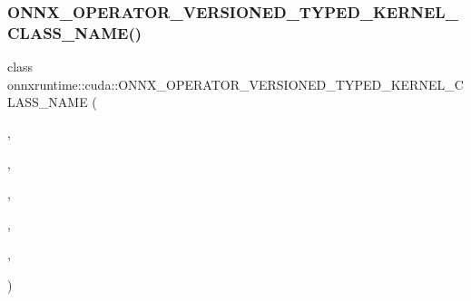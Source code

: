 \subsubsection{\texorpdfstring{O\+N\+N\+X\+\_\+\+O\+P\+E\+R\+A\+T\+O\+R\+\_\+\+V\+E\+R\+S\+I\+O\+N\+E\+D\+\_\+\+T\+Y\+P\+E\+D\+\_\+\+K\+E\+R\+N\+E\+L\+\_\+\+C\+L\+A\+S\+S\+\_\+\+N\+A\+M\+E()}{ONNX\_OPERATOR\_VERSIONED\_TYPED\_KERNEL\_CLASS\_NAME()}\hspace{0.1cm}{\footnotesize\ttfamily [10/10]}}
{\footnotesize\ttfamily class onnxruntime\+::cuda\+::\+O\+N\+N\+X\+\_\+\+O\+P\+E\+R\+A\+T\+O\+R\+\_\+\+V\+E\+R\+S\+I\+O\+N\+E\+D\+\_\+\+T\+Y\+P\+E\+D\+\_\+\+K\+E\+R\+N\+E\+L\+\_\+\+C\+L\+A\+S\+S\+\_\+\+N\+A\+ME (\begin{DoxyParamCaption}\item[{\mbox{\hyperlink{namespaceonnxruntime_a73ebc64887ddd1968e3cef47ffefe35b}{k\+Cuda\+Execution\+Provider}}}]{,  }\item[{\mbox{\hyperlink{namespaceonnxruntime_ac0e7c0c106a2c9e9594560a3ab289fa0}{k\+Onnx\+Domain}}}]{,  }\item[{6}]{,  }\item[{7}]{,  }\item[{uint32\+\_\+t}]{,  }\item[{\mbox{\hyperlink{classonnxruntime_1_1cuda_1_1Sum}{Sum}}}]{ }\end{DoxyParamCaption})}

\mbox{\label{namespaceonnxruntime_1_1cuda_a89919b025b81f1491d68cc99fb35ff6d}} 
